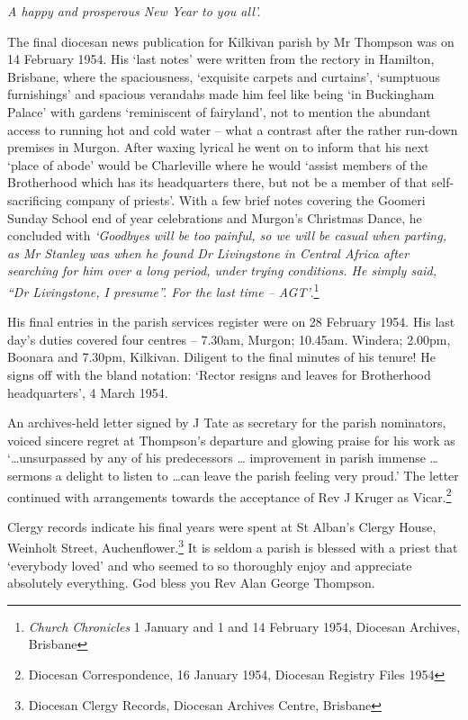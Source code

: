 \emph{A happy and prosperous New Year to you all'.}

The final diocesan news publication for Kilkivan parish by Mr Thompson was on 14 February 1954. His `last notes' were written from the rectory in Hamilton, Brisbane, where the spaciousness, `exquisite carpets and curtains', `sumptuous furnishings' and spacious verandahs made him feel like being `in Buckingham Palace' with gardens `reminiscent of fairyland', not to mention the abundant access to running hot and cold water -- what a contrast after the rather run-down premises in Murgon. After waxing lyrical he went on to inform that his next `place of abode' would be Charleville where he would `assist members of the Brotherhood which has its headquarters there, but not be a member of that self-sacrificing company of priests'. With a few brief notes covering the Goomeri Sunday School end of year celebrations and Murgon's Christmas Dance, he concluded with \emph{`Goodbyes will be too painful, so we will be casual when parting, as Mr Stanley was when he found Dr Livingstone in Central Africa after searching for him over a long period, under trying conditions. He simply said, ``Dr Livingstone, I presume''. For the last time -- AGT'}.\footnote{\emph{Church Chronicles} 1 January and 1 and 14 February 1954, Diocesan Archives, Brisbane}

His final entries in the parish services register were on 28 February 1954. His last day's duties covered four centres -- 7.30am, Murgon; 10.45am. Windera; 2.00pm, Boonara and 7.30pm, Kilkivan. Diligent to the final minutes of his tenure! He signs off with the bland notation: `Rector resigns and leaves for Brotherhood headquarters', 4 March 1954.

An archives-held letter signed by J Tate as secretary for the parish nominators, voiced sincere regret at Thompson's departure and glowing praise for his work as `\ldots unsurpassed by any of his predecessors \ldots{} improvement in parish immense \ldots{} sermons a delight to listen to \ldots can leave the parish feeling very proud.' The letter continued with arrangements towards the acceptance of Rev J Kruger as Vicar.\footnote{Diocesan Correspondence, 16 January 1954, Diocesan Registry Files 1954}

Clergy records indicate his final years were spent at St Alban's Clergy House, Weinholt Street, Auchenflower.\footnote{Diocesan Clergy Records, Diocesan Archives Centre, Brisbane} It is seldom a parish is blessed with a priest that `everybody loved' and who seemed to so thoroughly enjoy and appreciate absolutely everything. God bless you Rev Alan George Thompson.

